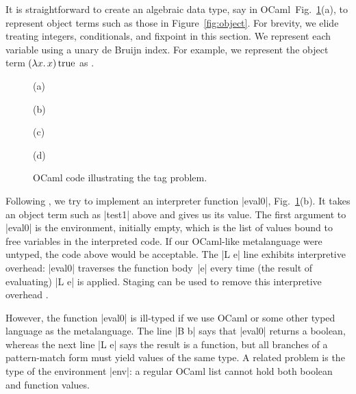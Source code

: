 It is straightforward to create an algebraic data type, say in OCaml\ifshort\
Fig.~\ref{fig:tag-problem}(a)\fi, to
represent object terms such as those in Figure~\ref{fig:object}.
For brevity, we elide treating integers, conditionals, and fixpoint in
this section.
\ifshort\else{}\fi
We represent each variable using a unary de Bruijn index.
For example, we represent the object term $(\mathopen{\lambda\mathord{x}.\,}x)\mathinner{\mathrm{true}}$ as
\ifshort {}.\else {}\fi

\ifshort
\begin{figure}
%
(a) 

(b) 

(c) 

(d) 
\caption{OCaml code illustrating the tag problem.}
\label{fig:tag-problem}
\end{figure}
\fi

Following \cite{WalidICFP02},
we try to implement an interpreter function |eval0|\ifshort,
Fig.~\ref{fig:tag-problem}(b)\fi. It takes
an object term such as |test1| above and gives us its value.
The first argument to |eval0| is the environment, initially empty,
which is the list of values bound to free variables in the
interpreted code.
\ifshort\else{}\fi
If our OCaml-like metalanguage were untyped, the code above would be 
acceptable.
The |L e| line exhibits interpretive overhead:
|eval0| traverses the function body~|e| every time (the result of
evaluating) |L e| is applied. Staging can be used to remove this
interpretive overhead \citep[\S1.1--2]{WalidICFP02}.

However, the function |eval0| is ill-typed
if we use OCaml or some other typed language as the metalanguage.
The line |B b|
says that |eval0| returns a boolean, whereas the next line |L e| says
the result is a function, but all branches of a pattern-match form must
yield values of the same type. 
A related problem is the type of the environment |env|: a regular
OCaml list cannot hold both boolean and function values. 

